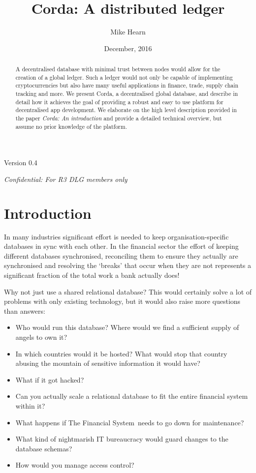 \documentclass{article}
\author{Mike Hearn}
\date{December, 2016}
\title{Corda: A distributed ledger}
\begin{document}
\maketitle

\begin{center}
Version 0.4

\emph{Confidential: For R3 DLG members only}
\end{center}

\vspace{10mm}

\begin{abstract}

A decentralised database with minimal trust between nodes would allow for the creation of a global ledger. Such a ledger
would not only be capable of implementing cryptocurrencies but also have many useful applications in finance, trade,
supply chain tracking and more. We present Corda, a decentralised global database, and describe in detail how it
achieves the goal of providing a robust and easy to use platform for decentralised app development. We elaborate on the
high level description provided in the paper \emph{Corda: An introduction}\cite{CordaIntro} and provide a detailed
technical overview, but assume no prior knowledge of the platform.

\end{abstract}
\newpage
\tableofcontents
\newpage
\section{Introduction}

In many industries significant effort is needed to keep organisation-specific databases in sync with each
other. In the financial sector the effort of keeping different databases synchronised, reconciling them to ensure
they actually are synchronised and resolving the `breaks' that occur when they are not represents a significant
fraction of the total work a bank actually does!

Why not just use a shared relational database? This would certainly solve a lot of problems with only existing technology,
but it would also raise more questions than answers:

\begin{itemize}
\item Who would run this database? Where would we find a sufficient supply of angels to own it?
\item In which countries would it be hosted? What would stop that country abusing the mountain of sensitive information it would have?
\item What if it got hacked?
\item Can you actually scale a relational database to fit the entire financial system within it?
\item What happens if The Financial System\texttrademark~needs to go down for maintenance?
\item What kind of nightmarish IT bureaucracy would guard changes to the database schemas?
\item How would you manage access control?
\end{itemize}
\end{document}
